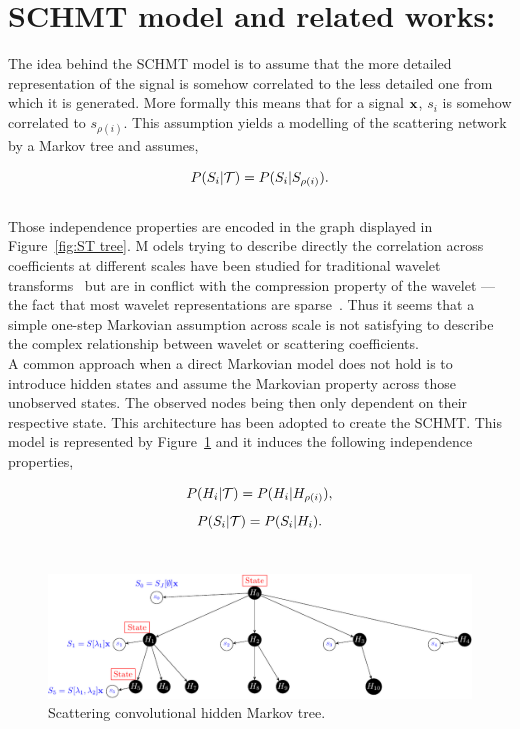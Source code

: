 \documentclass[a4paper,11pt]{report}
\begin{document}
  
  \section{SCHMT model and related works:}
    \label{sec:SCHMT/Rel work}
      
    The idea behind the SCHMT model is to assume that the more detailed representation of the signal is somehow correlated to the less detailed one from which it is generated. More formally this means that for a signal ${\bf x}$, $s_{i}$ is somehow correlated to $s_{\rho(i)}$. This assumption yields a modelling of the scattering network by a Markov tree and assumes,
    
    \begin{equation}
      P(S_{i} |\mathcal{T}) = P(S_{i} | S_{\rho(i)}).
      \label{eq:SMT - false hypo}
    \end{equation}\\

    Those independence properties are encoded in the graph displayed in Figure~\ref{fig:ST tree}. M
odels trying to describe directly the correlation across coefficients at different scales have been studied for traditional wavelet transforms~\citep{lee1996new} but are in conflict with the compression property of the wavelet ---\ie the fact that most wavelet representations are sparse~\citep{crouse1998wavelet}. Thus it seems that a simple one-step Markovian assumption across scale is not satisfying to describe the complex relationship between wavelet or scattering coefficients.\\
    
    A common approach when a direct Markovian model does not hold is to introduce hidden states and assume the Markovian property across those unobserved states. The observed nodes being then only dependent on their respective state. This architecture has been adopted to create the SCHMT. This model is represented by Figure~\ref{fig:SCHMT 1} and it induces the following independence properties,
    
    \begin{equation}
      P(H_{i} |\mathcal{T}) = P(H_{i} | H_{\rho(i)}),
      \label{eq:SCHMT - hypo 1}
    \end{equation}    
    \begin{equation}
      P(S_{i} |\mathcal{T}) = P(S_{i} | H_{i}).
      \label{eq:SCHMT - hypo 2}
    \end{equation} \\
    
		\begin{figure}[h]
				\begin{center}
					\includegraphics[width=5in]{scat_HMT_crop.pdf}
					\caption{Scattering convolutional hidden Markov tree.}
					\label{fig:SCHMT 1}
				\end{center}
		\end{figure}
		
\end{document}
